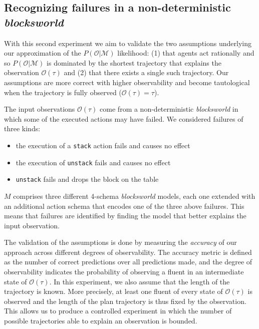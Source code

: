 \documentclass[letterpaper]{article} %
\begin{document}
\subsection{Recognizing failures in a non-deterministic {\em blocksworld}}
With this second experiment we aim to validate the two assumptions underlying our approximation of the $P(\mathcal{O}|\mathcal{M})$ likelihood: (1) that agents act rationally and so $P(\mathcal{O}|\mathcal{M})$ is dominated by the shortest trajectory that explains the observation $\mathcal{O}(\tau)$ and (2) that there exists a single such trajectory. Our assumptions are more correct with higher observability and become tautological when the trajectory is fully observed ($\mathcal{O(\tau)} = \tau$).

The input observations $\mathcal{O}(\tau)$ come from a non-deterministic {\em blocksworld} in which some of the executed actions may have failed. We considered failures of three kinds:

\begin{itemize}
	\item the execution of a {\tt\small stack} action fails and causes no effect
	\item the execution of {\tt\small unstack} fails and causes no effect
	\item {\tt\small unstack} fails and drops the block on the table
\end{itemize}

$M$ comprises three different 4-schema {\em blocksworld} models, each one extended with an additional action schema that encodes one of the three above failures. This means that failures are identified by finding the model that better explains the input observation.


The validation of the assumptions is done by measuring the {\em  accuracy} of our approach across different degrees of observability. The accuracy metric is defined as the number of correct predictions over all predictions made, and the degree of observability indicates the probability of observing a fluent in an intermediate state of $\mathcal{O}(\tau)$. In this experiment, we also assume that the length of the trajectory is known. More precisely, at least one fluent of every state of $\mathcal{O}(\tau)$ is observed and the length of the plan trajectory is thus fixed by the observation. This allows us to produce a controlled experiment in which the number of possible trajectories able to explain an observation is bounded.

\end{document}
